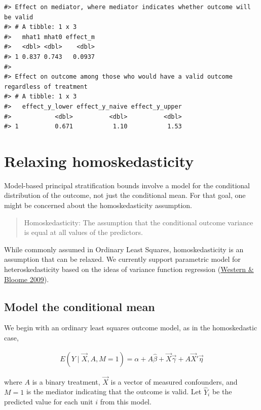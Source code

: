 \documentclass[
]{book}
\begin{document}
\begin{verbatim}
#> Effect on mediator, where mediator indicates whether outcome will be valid
#> # A tibble: 1 x 3
#>   mhat1 mhat0 effect_m
#>   <dbl> <dbl>    <dbl>
#> 1 0.837 0.743   0.0937
#> 
#> Effect on outcome among those who would have a valid outcome regardless of treatment
#> # A tibble: 1 x 3
#>   effect_y_lower effect_y_naive effect_y_upper
#>            <dbl>          <dbl>          <dbl>
#> 1          0.671           1.10           1.53
\end{verbatim}

\hypertarget{relaxing-homoskedasticity}{%
\chapter{Relaxing homoskedasticity}\label{relaxing-homoskedasticity}}

Model-based principal stratification bounds involve a model for the conditional distribution of the outcome, not just the conditional mean. For that goal, one might be concerned about the homoskedasticity assumption.

\begin{quote}
Homoskedasticity: The assumption that the conditional outcome variance is equal at all values of the predictors.
\end{quote}

While commonly assumed in Ordinary Least Squares, homoskedasticity is an assumption that can be relaxed. We currently support parametric model for heteroskedasticity based on the ideas of variance function regression (\href{https://doi.org/10.1111/j.1467-9531.2009.01222.x}{Western \& Bloome 2009}).

\hypertarget{model-the-conditional-mean}{%
\section{Model the conditional mean}\label{model-the-conditional-mean}}

We begin with an ordinary least squares outcome model, as in the homoskedastic case,

\[\begin{aligned}
E(Y\mid \vec{X},A,M = 1) =\alpha + A\hat\beta  + \vec{X}\vec\gamma + A\vec{X}'\vec\eta
\end{aligned}\]

where \(A\) is a binary treatment, \(\vec{X}\) is a vector of measured confounders, and \(M = 1\) is the mediator indicating that the outcome is valid. Let \(\hat{Y}_i\) be the predicted value for each unit \(i\) from this model.
\end{document}
